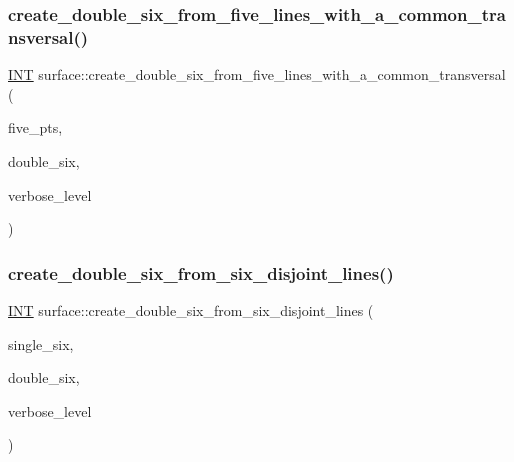\subsubsection{\texorpdfstring{create\+\_\+double\+\_\+six\+\_\+from\+\_\+five\+\_\+lines\+\_\+with\+\_\+a\+\_\+common\+\_\+transversal()}{create\_double\_six\_from\_five\_lines\_with\_a\_common\_transversal()}}
{\footnotesize\ttfamily \mbox{\hyperlink{galois_8h_a09fddde158a3a20bd2dcadb609de11dc}{I\+NT}} surface\+::create\+\_\+double\+\_\+six\+\_\+from\+\_\+five\+\_\+lines\+\_\+with\+\_\+a\+\_\+common\+\_\+transversal (\begin{DoxyParamCaption}\item[{\mbox{\hyperlink{galois_8h_a09fddde158a3a20bd2dcadb609de11dc}{I\+NT}} $\ast$}]{five\+\_\+pts,  }\item[{\mbox{\hyperlink{galois_8h_a09fddde158a3a20bd2dcadb609de11dc}{I\+NT}} $\ast$}]{double\+\_\+six,  }\item[{\mbox{\hyperlink{galois_8h_a09fddde158a3a20bd2dcadb609de11dc}{I\+NT}}}]{verbose\+\_\+level }\end{DoxyParamCaption})}

\mbox{\label{classsurface_a4c44f0a33d709edee71537547880dd87}} 
\subsubsection{\texorpdfstring{create\+\_\+double\+\_\+six\+\_\+from\+\_\+six\+\_\+disjoint\+\_\+lines()}{create\_double\_six\_from\_six\_disjoint\_lines()}}
{\footnotesize\ttfamily \mbox{\hyperlink{galois_8h_a09fddde158a3a20bd2dcadb609de11dc}{I\+NT}} surface\+::create\+\_\+double\+\_\+six\+\_\+from\+\_\+six\+\_\+disjoint\+\_\+lines (\begin{DoxyParamCaption}\item[{\mbox{\hyperlink{galois_8h_a09fddde158a3a20bd2dcadb609de11dc}{I\+NT}} $\ast$}]{single\+\_\+six,  }\item[{\mbox{\hyperlink{galois_8h_a09fddde158a3a20bd2dcadb609de11dc}{I\+NT}} $\ast$}]{double\+\_\+six,  }\item[{\mbox{\hyperlink{galois_8h_a09fddde158a3a20bd2dcadb609de11dc}{I\+NT}}}]{verbose\+\_\+level }\end{DoxyParamCaption})}

